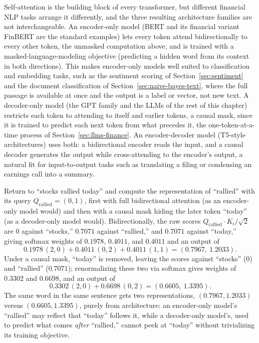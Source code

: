 \documentclass[../ai_in_finance]{subfiles}
\begin{document}
Self-attention is the building block of every transformer, but different financial NLP tasks arrange it differently, and the three resulting architecture families are not interchangeable. An encoder-only model
(BERT and its financial variant FinBERT are the standard examples) lets every token attend bidirectionally to every other token, the unmasked computation above, and is trained with a masked-language-modeling objective
(predicting a hidden word from its context in both directions). This makes encoder-only models well
 suited to classification and embedding tasks, such as the sentiment scoring of Section~\ref{sec:sentiment} and the document classification of
 Section~\ref{sec:naive-bayes-text}, where the full passage is available at once and the output is a label or vector,
 not new text. A decoder-only model (the GPT family and the LLMs of the rest of this chapter) restricts
 each token to attending to itself and earlier tokens, a causal mask, since it is trained to predict each next token from what precedes
 it, the one-token-at-a-time process of Section~\ref{sec:llms-finance}. An encoder-decoder model (T5-style architectures)
 uses both: a bidirectional encoder reads the input, and a causal decoder generates the output while cross-attending
 to the encoder's output, a natural fit for input-to-output tasks such as translating a filing
 or condensing an earnings call into a summary.

Return to ``stocks rallied today'' and compute the representation of ``rallied'' with its query $Q_{\text{rallied}} = (0,1)$, first with full bidirectional attention (as an encoder-only model would) and then with a causal mask hiding the later token ``today'' (as a decoder-only model would). Bidirectionally, the raw scores $Q_{\text{rallied}} \cdot K_i/\sqrt{2}$ are $0$ against ``stocks,'' $0.7071$ against ``rallied,'' and $0.7071$ against ``today,'' giving softmax weights of $0.1978$, $0.4011$, and $0.4011$ and an output of
\begin{equation*}
0.1978\,(2,0) + 0.4011\,(0,2) + 0.4011\,(1,1) = (0.7967,\ 1.2033).
\end{equation*}
Under a causal mask, ``today'' is removed, leaving the scores against ``stocks'' ($0$) and ``rallied'' ($0.7071$); renormalizing these two via softmax gives weights of $0.3302$ and $0.6698$, and an output of
\begin{equation*}
0.3302\,(2,0) + 0.6698\,(0,2) = (0.6605,\ 1.3395).
\end{equation*}
The same word in the same sentence gets two representations, $(0.7967, 1.2033)$ versus $(0.6605, 1.3395)$, purely from architecture: an encoder-only model's ``rallied'' may reflect that ``today'' follows it, while a decoder-only model's, used to predict what comes \emph{after} ``rallied,'' cannot peek at ``today'' without trivializing its training objective.
\end{document}
